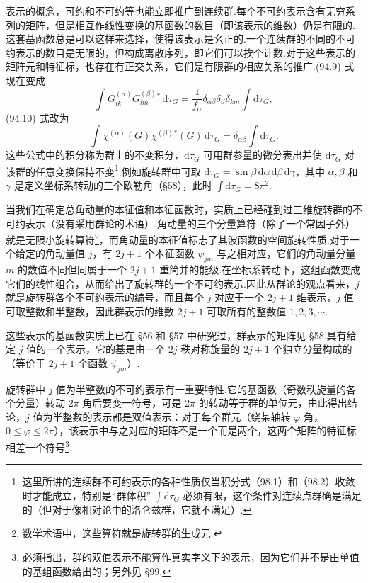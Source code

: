 表示的概念，可约和不可约等也能立即推广到连续群.每个不可约表示含有无穷系列的矩阵，但是相互作线性变换的基函数的数目（即该表示的维数）仍是有限的.这套基函数总是可以这样来选择，使得该表示是幺正的.一个连续群的不同的不可约表示的数目是无限的，但构成离散序列，即它们可以挨个计数.对于这些表示的矩阵元和特征标，也存在有正交关系，它们是有限群的相应关系的推广.(94.9) 式现在变成
\begin{equation}
  \int G_{ik}^{(\alpha)}G_{lm}^{(\beta)}{}^{*}\,\mathrm{d}\tau_G
  =\frac{1}{f_\alpha}\delta_{\alpha\beta}\delta_{il}\delta_{km}
  \int\mathrm{d}\tau_G,
\end{equation}
(94.10) 式改为
\begin{equation}
  \int\chi^{(\alpha)}(G)\chi^{(\beta)}{}^{*}(G)\,\mathrm{d}\tau_G
  =\delta_{\alpha\beta}\int\mathrm{d}\tau_G.
\end{equation}
这些公式中的积分称为群上的不变积分，$\mathrm{d}\tau_G$ 可用群参量的微分表出并使 $\mathrm{d}\tau_G$ 对该群的任意变换保持不变\footnote{这里所讲的连续群不可约表示的各种性质仅当积分式（98.1）和（98.2）收敛时才能成立，特别是“群体积” $\int\mathrm{d}\tau_G$ 必须有限，这个条件对连续点群确是满足的（但对于像相对论中的洛仑兹群，它就不满足）.}.例如旋转群中可取 $\mathrm{d}\tau_G=\sin\beta\,\mathrm{d}\alpha\,\mathrm{d}\beta\,\mathrm{d}\gamma$，其中 $\alpha,\beta$ 和 $\gamma$ 是定义坐标系转动的三个欧勒角（§58），此时 $\int\mathrm{d}\tau_G=8\pi^2$.

当我们在确定总角动量的本征值和本征函数时，实质上已经碰到过三维旋转群的不可约表示（没有采用群论的术语）.角动量的三个分量算符（除了一个常因子外）就是无限小旋转算符\footnote{数学术语中，这些算符就是旋转群的生成元.}，而角动量的本征值标志了其波函数的空间旋转性质.对于一个给定的角动量值 $j$，有 $2j+1$ 个本征函数 $\psi_{jm}$ 与之相对应，它们的角动量分量 $m$ 的数值不同但同属于一个 $2j+1$ 重简并的能级.在坐标系转动下，这组函数变成它们的线性组合，从而给出了旋转群的一个不可约表示.因此从群论的观点看来，$j$ 就是旋转群各个不可约表示的编号，而且每个 $j$ 对应于一个 $2j+1$ 维表示，$j$ 值可取整数和半整数，因此群表示的维数 $2j+1$ 可取所有的整数值 $1,2,3,\cdots$.

这些表示的基函数实质上已在 §56 和 §57 中研究过，群表示的矩阵见 §58.具有给定 $j$ 值的一个表示，它的基是由一个 $2j$ 秩对称旋量的 $2j+1$ 个独立分量构成的（等价于 $2j+1$ 个函数 $\psi_{jm}$）.

旋转群中 $j$ 值为半整数的不可约表示有一重要特性.它的基函数（奇数秩旋量的各个分量）转动 $2\pi$ 角后要变一符号，可是 $2\pi$ 的转动等于群的单位元，由此得出结论，$j$ 值为半整数的表示都是双值表示：对于每个群元（绕某轴转 $\varphi$ 角，$0\leqslant\varphi\leqslant2\pi$），该表示中与之对应的矩阵不是一个而是两个，这两个矩阵的特征标相差一个符号\footnote{必须指出，群的双值表示不能算作真实字义下的表示，因为它们并不是由单值的基组函数给出的；另外见 §99.}.

